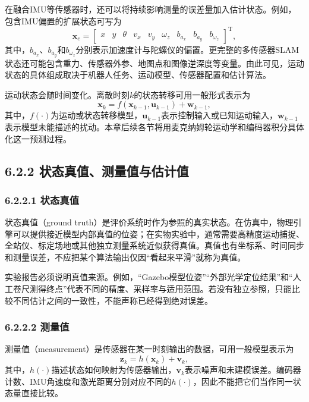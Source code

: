 \documentclass[UTF8,zihao=-4]{ctexart}
\newcommand{\vect}[1]{\bm{#1}}
\begin{document}
在融合IMU等传感器时，还可以将持续影响测量的误差量加入估计状态。例如，包含IMU偏置的扩展状态可写为
\begin{equation}
  \vect{x}_{e}=
  \begin{bmatrix}
    x & y & \theta & v_x & v_y & \omega_z & b_{a_x} & b_{a_y} & b_{\omega_z}
  \end{bmatrix}^{\mathrm T},
  \label{eq:extended-state}
\end{equation}
其中，$b_{a_x}$、$b_{a_y}$和$b_{\omega_z}$分别表示加速度计与陀螺仪的偏置。更完整的多传感器SLAM状态还可能包含重力、传感器外参、地图点和图像逆深度等变量\cite{fan2025fusion}。由此可见，运动状态的具体组成取决于机器人任务、运动模型、传感器配置和估计算法。

运动状态会随时间变化。离散时刻$k$的状态转移可用一般形式表示为
\begin{equation}
  \vect{x}_{k}=f(\vect{x}_{k-1},\vect{u}_{k-1})+\vect{w}_{k-1},
  \label{eq:state-transition}
\end{equation}
其中，$f(\cdot)$为运动或状态转移模型，$\vect{u}_{k-1}$表示控制输入或已知运动输入，$\vect{w}_{k-1}$表示模型未能描述的扰动。本章后续各节将用麦克纳姆轮运动学和编码器积分具体化这一预测过程。

\subsection*{6.2.2 状态真值、测量值与估计值}

\subsubsection*{6.2.2.1 状态真值}

状态真值（ground truth）是评价系统时作为参照的真实状态。在仿真中，物理引擎可以提供接近模型内部真值的位姿；在实物实验中，通常需要高精度运动捕捉、全站仪、标定场地或其他独立测量系统近似获得真值。真值也有坐标系、时间同步和测量误差，不应把某个算法输出仅因“看起来平滑”就称为真值。

实验报告必须说明真值来源。例如，“Gazebo模型位姿”“外部光学定位结果”和“人工卷尺测得终点”代表不同的精度、采样率与适用范围。若没有独立参照，只能比较不同估计之间的一致性，不能声称已经得到绝对误差。

\subsubsection*{6.2.2.2 测量值}

测量值（measurement）是传感器在某一时刻输出的数据，可用一般模型表示为
\begin{equation}
  \vect{z}_k=h(\vect{x}_k)+\vect{v}_k,
  \label{eq:measurement-model}
\end{equation}
其中，$h(\cdot)$描述状态如何映射为传感器输出，$\vect{v}_k$表示噪声和未建模误差。编码器计数、IMU角速度和激光距离分别对应不同的$h(\cdot)$，因此不能把它们当作同一状态量直接比较。
\end{document}

